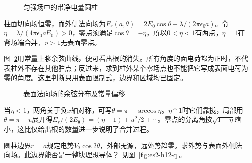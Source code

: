 \begin{figure}[H]\centering
{}
\caption{匀强场中的带净电量圆柱}\label{fig:es2-h11-q}
\end{figure}
\begin{solution}
柱面切向场恒零，而外侧法向场为$E_r(a,\theta)=2E_0\cos\theta+\lambda/(2\pi\epsilon_0a)$。令$\eta=\lambda/(4\pi\epsilon_0aE_0)>0$，零点须满足$\cos\theta=-\eta$，所以$0<\eta<1$有两点，$\eta=1$在背场端合并，$\eta>1$无表面零点。

图~\ref{fig:es2-h11-s}用常量上移余弦曲线，便可看出根的消失。所有角度的面电荷都为正时，不代表柱外不存在其他驻点；反过来，求到柱外某个零场点也不能把它写成表面电荷为零的角度。这里判断只用表面限制式，边界和区域均已固定。
\begin{figure}[H]\centering
{}
\caption{表面法向场的余弦分布及常量偏移}\label{fig:es2-h11-s}
\end{figure}


当$\eta<1$，两角关于负$x$轴对称，可写$\theta=\pi\pm\arccos\eta$。$\eta\uparrow1$时它们靠拢，局部用$\theta=\pi+u$展开得$E_r/(2E_0)=(\eta-1)+u^2/2+\cdots$。零点的分离角按$\sqrt{1-\eta}$缩小，这比仅给出根的数量进一步说明了合并过程。
\end{solution}

\begin{exercise}[圆边界上二次角模的外场]\label{ex:es2-h12}
圆柱边界$r=a$规定电势$V_2\cos2\theta$，外部无源，远处势趋零。求外势与表面外侧法向场。此边界能否是一整块理想导体？ 见图~\ref{fig:es2-h12-q}。
\end{exercise}

